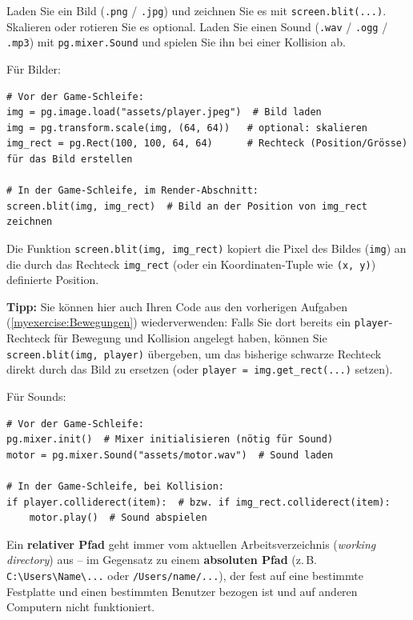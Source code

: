 \begin{myexercise}\label{myexercise:Medien}
    Laden Sie ein Bild (\lstinline|.png| / \lstinline|.jpg|) und zeichnen Sie es mit \lstinline|screen.blit(...)|. Skalieren oder rotieren Sie es optional. Laden Sie einen Sound (\lstinline|.wav| / \lstinline|.ogg| / \lstinline|.mp3|) mit \lstinline|pg.mixer.Sound| und spielen Sie ihn bei einer Kollision ab.

    Für Bilder:
    \begin{lstlisting}
# Vor der Game-Schleife:
img = pg.image.load("assets/player.jpeg")  # Bild laden
img = pg.transform.scale(img, (64, 64))   # optional: skalieren
img_rect = pg.Rect(100, 100, 64, 64)      # Rechteck (Position/Grösse) für das Bild erstellen

# In der Game-Schleife, im Render-Abschnitt:
screen.blit(img, img_rect)  # Bild an der Position von img_rect zeichnen
\end{lstlisting}

    Die Funktion \lstinline|screen.blit(img, img_rect)| kopiert die Pixel des Bildes (\lstinline|img|) an die durch das Rechteck \lstinline|img_rect| (oder ein Koordinaten-Tuple wie \lstinline|(x, y)|) definierte Position.

    \textbf{Tipp:} Sie können hier auch Ihren Code aus den vorherigen Aufgaben (\cref{myexercise:Bewegungen}) wiederverwenden: Falls Sie dort bereits ein \lstinline|player|-Rechteck für Bewegung und Kollision angelegt haben, können Sie \lstinline|screen.blit(img, player)| übergeben, um das bisherige schwarze Rechteck direkt durch das Bild zu ersetzen (oder \lstinline|player = img.get_rect(...)| setzen).

    Für Sounds:
    \begin{lstlisting}
# Vor der Game-Schleife:
pg.mixer.init()  # Mixer initialisieren (nötig für Sound)
motor = pg.mixer.Sound("assets/motor.wav")  # Sound laden

# In der Game-Schleife, bei Kollision:
if player.colliderect(item):  # bzw. if img_rect.colliderect(item):
    motor.play()  # Sound abspielen
\end{lstlisting}

    \begin{myattention}
        Ein \textbf{relativer Pfad} geht immer vom aktuellen Arbeitsverzeichnis (\textit{working directory}) aus -- im Gegensatz zu einem \textbf{absoluten Pfad} (z.\,B. \texttt{C:\textbackslash Users\textbackslash Name\textbackslash ...} oder \texttt{/Users/name/...}), der fest auf eine bestimmte Festplatte und einen bestimmten Benutzer bezogen ist und auf anderen Computern nicht funktioniert.


\end{myattention}
\end{myexercise}
